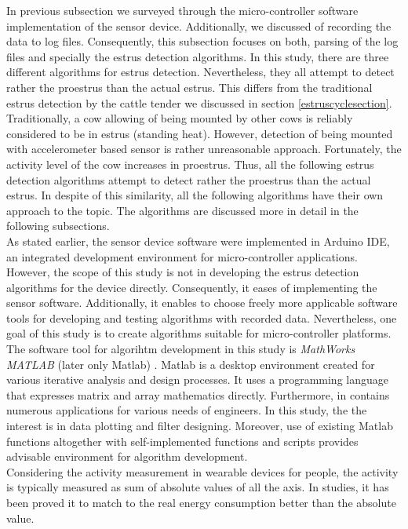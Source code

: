 \documentclass[english,12pt,a4paper,pdftex,elec,utf8]{aaltothesis}
\begin{document}
In previous subsection we surveyed through the micro-controller software implementation of the sensor device. Additionally, we discussed of recording the data to log files. Consequently, this subsection focuses on both, parsing of the log files and specially the estrus detection algorithms. In this study, there are three different algorithms for estrus detection. Nevertheless, they all attempt to detect rather the proestrus than the actual estrus. This differs from the traditional estrus detection by the cattle tender we discussed in section \ref{estruscyclesection}. Traditionally, a cow allowing of being mounted by other cows is reliably considered to be in estrus (standing heat). However, detection of being mounted with accelerometer based sensor is rather unreasonable approach. Fortunately, the activity level of the cow increases in proestrus. Thus, all the following estrus detection algorithms attempt to detect rather the proestrus than the actual estrus. In despite of this similarity, all the following algorithms have their own approach to the topic. The algorithms are discussed more in detail in the following subsections.  \\

As stated earlier, the sensor device software were implemented in Arduino IDE, an integrated development environment for micro-controller applications. However, the scope of this study is not in developing the estrus detection algorithms for the device directly. Consequently, it eases of implementing the sensor software. Additionally, it enables to choose freely more applicable software tools for developing and testing algorithms with recorded data. Nevertheless, one goal of this study is to create algorithms suitable for micro-controller platforms. The software tool for algorihtm development in this study is \textit{MathWorks MATLAB} (later only Matlab) \cite{matlaboverview}. Matlab is a desktop environment created for various iterative analysis and design processes. It uses a programming language that expresses matrix and array mathematics directly. Furthermore, in contains numerous applications for various needs of engineers. In this study, the the interest is in data plotting and filter designing. Moreover, use of existing Matlab functions altogether with self-implemented functions and scripts provides advisable environment for algorithm development.  \\



Considering the activity measurement in wearable devices for people, the activity is typically measured as sum of absolute values of all the axis. In studies, it has been proved it to match to the real energy consumption better than the absolute value. \\
\end{document}
